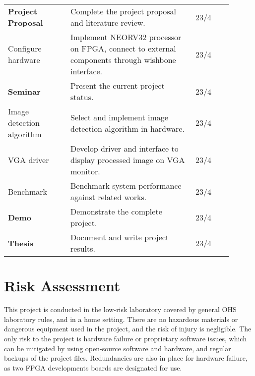 \begin{center}
\begin{longtable}{p{0.25\linewidth}p{0.5\linewidth}p{0.15\linewidth}}
        \textbf{Project Proposal}	& Complete the project proposal and literature review.                                              & 23/4 \\
        Configure hardware			& Implement NEORV32 processor on FPGA, connect to external components through wishbone interface.   & 23/4 \\
        \textbf{Seminar}            & Present the current project status.                                                               & 23/4 \\
        Image detection algorithm   & Select and implement image detection algorithm in hardware.                                       & 23/4 \\
        VGA driver                  & Develop driver and interface to display processed image on VGA monitor.                           & 23/4 \\
        Benchmark                   & Benchmark system performance against related works.                                               & 23/4 \\
        \textbf{Demo}               & Demonstrate the complete project.                                                                 & 23/4 \\
        \textbf{Thesis}             & Document and write project results.                                                               & 23/4 \\
    \end{longtable}
\end{center}


\nopagebreak


\section{Risk Assessment}
This project is conducted in the low-risk laboratory covered by general OHS laboratory rules, and in a home setting. 
There are no hazardous materials or dangerous equipment used in the project, and the risk of injury is negligible.
The only risk to the project is hardware failure or proprietary software issues, which can be mitigated by using open-source software and hardware, and regular backups of the project files.
Redundancies are also in place for hardware failure, as two FPGA developments boards are designated for use.